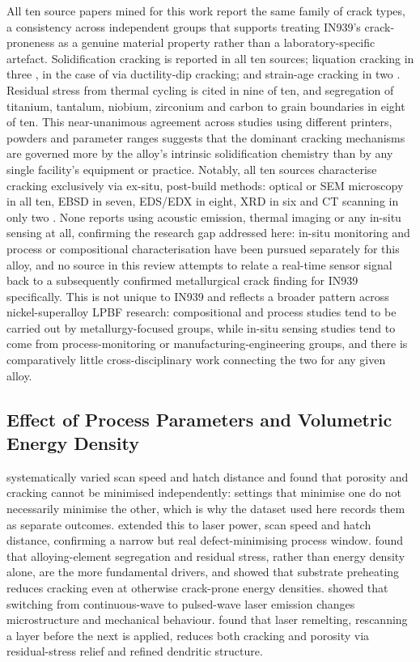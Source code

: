 \documentclass[a4paper]{article}
\begin{document}
All ten source papers mined for this work report the same family of crack types, a consistency across independent groups that supports treating IN939's crack-proneness as a genuine material property rather than a laboratory-specific artefact. Solidification cracking is reported in all ten sources; liquation cracking in three \citep{ozer2024,marchese2020,hu2024}, in the case of \citet{hu2024} via ductility-dip cracking; and strain-age cracking in two \citep{ozer2024,hu2024}. Residual stress from thermal cycling is cited in nine of ten, and segregation of titanium, tantalum, niobium, zirconium and carbon to grain boundaries in eight of ten. This near-unanimous agreement across studies using different printers, powders and parameter ranges suggests that the dominant cracking mechanisms are governed more by the alloy's intrinsic solidification chemistry than by any single facility's equipment or practice. Notably, all ten sources characterise cracking exclusively via ex-situ, post-build methods: optical or SEM microscopy in all ten, EBSD in seven, EDS/EDX in eight, XRD in six and CT scanning in only two \citep{zhang2023,bae2025}. None reports using acoustic emission, thermal imaging or any in-situ sensing at all, confirming the research gap addressed here: in-situ monitoring and process or compositional characterisation have been pursued separately for this alloy, and no source in this review attempts to relate a real-time sensor signal back to a subsequently confirmed metallurgical crack finding for IN939 specifically. This is not unique to IN939 and reflects a broader pattern across nickel-superalloy LPBF research: compositional and process studies tend to be carried out by metallurgy-focused groups, while in-situ sensing studies tend to come from process-monitoring or manufacturing-engineering groups, and there is comparatively little cross-disciplinary work connecting the two for any given alloy.

\subsection{Effect of Process Parameters and Volumetric Energy Density}
\citet{marchese2020} systematically varied scan speed and hatch distance and found that porosity and cracking cannot be minimised independently: settings that minimise one do not necessarily minimise the other, which is why the dataset used here records them as separate outcomes. \citet{dogu2024} extended this to laser power, scan speed and hatch distance, confirming a narrow but real defect-minimising process window. \citet{li2024} found that alloying-element segregation and residual stress, rather than energy density alone, are the more fundamental drivers, and showed that substrate preheating reduces cracking even at otherwise crack-prone energy densities. \citet{rodriguezbarber2023} showed that switching from continuous-wave to pulsed-wave laser emission changes microstructure and mechanical behaviour. \citet{hu2024} found that laser remelting, rescanning a layer before the next is applied, reduces both cracking and porosity via residual-stress relief and refined dendritic structure.
\end{document}
